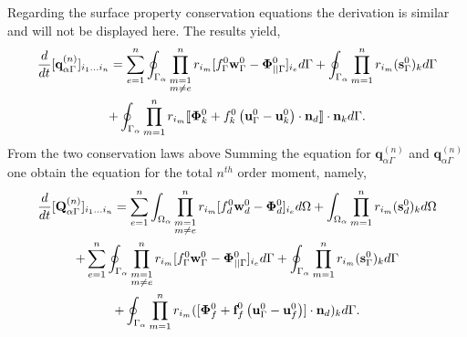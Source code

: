 Regarding the surface property conservation equations the derivation is similar and will not be displayed here. 
The results yield, 
\begin{multline}
    \frac{d}{dt} {[\textbf{q}_{\alpha\Gamma}^{(n)}]_{i_1\ldots i_n}}
    = \sum_{e=1}^{n} 
    \oint_{\Gamma_{\alpha}} 
        \prod^{n}_{\substack{ m=1 \\m \neq e}} r_{i_m} [f_\Gamma^0\textbf{w}_\Gamma^0 - \bm\Phi_{||\Gamma}^0]_{i_e}
     d\Gamma
    + \oint_{\Gamma_{\alpha}}  \prod_{m=1}^{n} r_{i_m} (\textbf{s}_\Gamma^0)_k  d\Gamma
    \\
    +\oint_{\Gamma_{\alpha}}  \prod_{m=1}^{n} r_{i_m} \llbracket \bm\Phi_k^0 + f_k^0 \left(\textbf{u}_\Gamma^0 - \textbf{u}_k^0\right)\cdot \textbf{n}_d \rrbracket \cdot \textbf{n}_k d\Gamma.
    \label{eq:dt_Qgamma_n}
\end{multline}
From the two conservation laws above 
Summing the equation for $\textbf{q}_{\alpha\Gamma}^{(n)}$ and $\textbf{q}_{\alpha\Gamma}^{(n)}$ one obtain the equation for the total $n^{th}$ order moment,  namely, 
\begin{multline}
    \frac{d}{dt} {[\textbf{Q}_{\alpha\Gamma}^{(n)}]_{i_1\ldots i_n}}
    = 
    \sum_{e=1}^{n} 
    \int_{\Omega_{\alpha}} 
        \prod^{n}_{\substack{ m=1 \\m \neq e}} r_{i_m} [f_d^0\textbf{w}_d^0  - \bm\Phi_d^0]_{i_e}
     d\Omega
    + \int_{\Omega_{\alpha}}  \prod_{m=1}^{n} r_{i_m} (\textbf{s}_d^0)_k  d\Omega\\
    +     
    \sum_{e=1}^{n} 
    \oint_{\Gamma_{\alpha}} 
        \prod^{n}_{\substack{ m=1 \\m \neq e}} r_{i_m} [f_\Gamma^0\textbf{w}_\Gamma^0 - \bm\Phi_{||\Gamma}^0]_{i_e}
     d\Gamma
    + \oint_{\Gamma_{\alpha}}  \prod_{m=1}^{n} r_{i_m} (\textbf{s}_\Gamma^0)_k  d\Gamma
    \\
    +\oint_{\Gamma_{\alpha}}  \prod_{m=1}^{n} r_{i_m} ([\bm\Phi_f^0 + \textbf{f}_f^0 \left(\textbf{u}_\Gamma^0 - \textbf{u}_f^0\right)]\cdot \textbf{n}_d)_k  d\Gamma. 
    \label{eq:dt_Q_n}
\end{multline}



